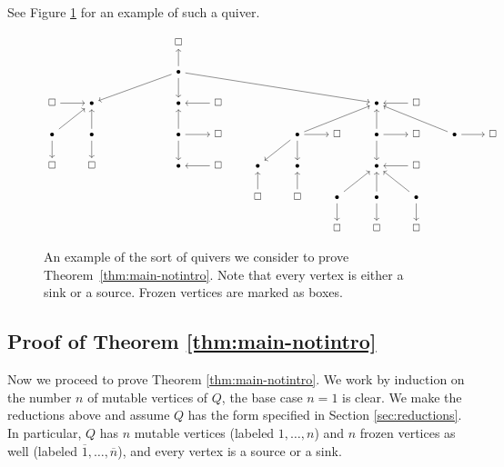 \documentclass{amsart}
\numberwithin{equation}{section}
\theoremstyle{definition}
\begin{document}
See Figure \ref{fig:quiver} for an example of such a quiver. 
\begin{figure}
    \centering
    
    \[\begin{tikzcd}
	&&&& \square &&&&&&&& \\
	&&&& {\bullet} \\
	\square & \bullet &&& \bullet & \square &&&& \bullet & \square \\
	\bullet & \bullet &&& \bullet & \square && \bullet & \square & \bullet & \square & \bullet & \square \\
	\square & \square &&& \bullet & \square & \bullet & \bullet && \bullet & \square \\
	&&&&&& \square & \square & \bullet & \bullet & \bullet \\
	&&&&&&&& \square & \square & \square
	\arrow[from=2-5, to=1-5]
	\arrow[from=2-5, to=3-2]
	\arrow[from=2-5, to=3-5]
	\arrow[from=2-5, to=3-10]
	\arrow[from=3-1, to=3-2]
	\arrow[from=3-6, to=3-5]
	\arrow[from=3-11, to=3-10]
	\arrow[from=4-1, to=3-2]
	\arrow[from=4-1, to=5-1]
	\arrow[from=4-2, to=3-2]
	\arrow[from=4-2, to=5-2]
	\arrow[from=4-5, to=3-5]
	\arrow[from=4-5, to=4-6]
	\arrow[from=4-5, to=5-5]
	\arrow[from=4-8, to=3-10]
	\arrow[from=4-8, to=4-9]
	\arrow[from=4-8, to=5-7]
	\arrow[from=4-8, to=5-8]
	\arrow[from=4-10, to=3-10]
	\arrow[from=4-10, to=4-11]
	\arrow[from=4-10, to=5-10]
	\arrow[from=4-12, to=3-10]
	\arrow[from=4-12, to=4-13]
	\arrow[from=5-6, to=5-5]
	\arrow[from=5-11, to=5-10]
	\arrow[from=6-7, to=5-7]
	\arrow[from=6-8, to=5-8]
	\arrow[from=6-9, to=5-10]
	\arrow[from=6-9, to=7-9]
	\arrow[from=6-10, to=5-10]
	\arrow[from=6-10, to=7-10]
	\arrow[from=6-11, to=5-10]
	\arrow[from=6-11, to=7-11]
\end{tikzcd}\]

    \caption{An example of the sort of quivers we consider to prove Theorem~\ref{thm:main-notintro}. Note that every vertex is either a sink or a source. Frozen vertices are marked as boxes. }%
    \label{fig:quiver}
\end{figure}

\subsection{Proof of Theorem \ref{thm:main-notintro}}
Now we proceed to prove Theorem \ref{thm:main-notintro}. We work by induction on the number $n$ of mutable vertices of $Q$, the base case $n = 1$ is clear. We make the reductions above and assume $Q$ has the form specified in Section \ref{sec:reductions}. In particular, $Q$ has $n$ mutable vertices (labeled $1, \dots, n$) and $n$ frozen vertices as well (labeled $\overline{1}, \dots, \overline{n}$), and every vertex is a source or a sink.
\end{document}
